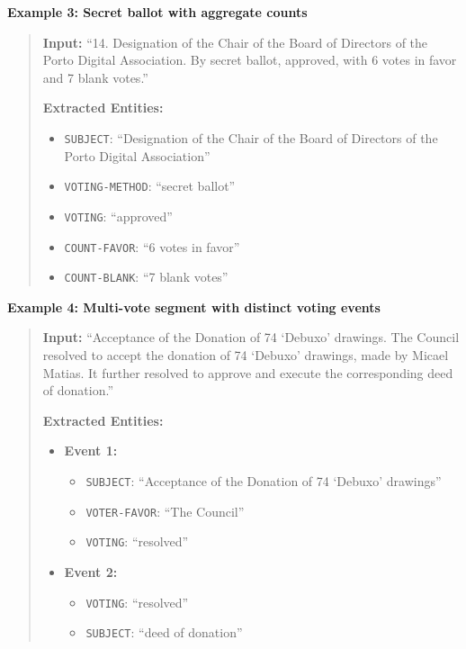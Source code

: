 \documentclass[11pt]{article}
\begin{document}
\noindent\textbf{Example 3: Secret ballot with aggregate counts}
\begin{quote}
\small
\textbf{Input:} ``14. Designation of the Chair of the Board of Directors of the Porto Digital Association. By secret ballot, approved, with 6 votes in favor and 7 blank votes.''

\textbf{Extracted Entities:}
\begin{itemize}
    \vspace{-0.5em}
    \setlength\itemsep{0em}
    \item \texttt{SUBJECT}: ``Designation of the Chair of the Board of Directors of the Porto Digital Association''
    \item \texttt{VOTING-METHOD}: ``secret ballot''
    \item \texttt{VOTING}: ``approved''
    \item \texttt{COUNT-FAVOR}: ``6 votes in favor''
    \item \texttt{COUNT-BLANK}: ``7 blank votes''
\end{itemize}
\end{quote}

\noindent\textbf{Example 4: Multi-vote segment with distinct voting events}
\begin{quote}
\small
\textbf{Input:} ``Acceptance of the Donation of 74 `Debuxo' drawings. The Council resolved to accept the donation of 74 `Debuxo' drawings, made by Micael Matias. It further resolved to approve and execute the corresponding deed of donation.''

\textbf{Extracted Entities:}
\begin{itemize}
    \vspace{-0.5em}
    \setlength\itemsep{0em}
    \item \textbf{Event 1:}
    \begin{itemize}
        \setlength\itemsep{0em}
        \item \texttt{SUBJECT}: ``Acceptance of the Donation of 74 `Debuxo' drawings''
        \item \texttt{VOTER-FAVOR}: ``The Council''
        \item \texttt{VOTING}: ``resolved''
    \end{itemize}
    \item \textbf{Event 2:}
    \begin{itemize}
        \setlength\itemsep{0em}
        \item \texttt{VOTING}: ``resolved''
        \item \texttt{SUBJECT}: ``deed of donation''
    \end{itemize}
\end{itemize}
\end{quote}
\end{document}
